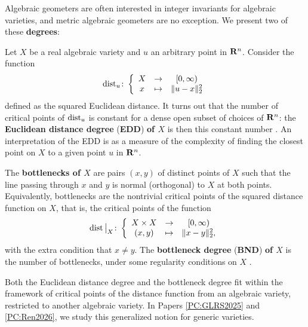 Algebraic geometers are often interested in integer invariants for algebraic varieties, and metric algebraic geometers are no exception. We present two of these \textbf{degrees}:

\begin{definition}
  Let $X$ be a real algebraic variety and $u$ an arbitrary point in $\mathbf{R}^n$. Consider the function
  \[
    \operatorname{dist}_u \colon \left\{ \begin{array}{ccc}
      X & \to & [0, \infty) \\
      x & \mapsto & \| u - x \|_2^2
    \end{array} \right.
  \]
  defined as the squared Euclidean distance. It turns out that the number of critical points of $\operatorname{dist}_u$ is constant for a dense open subset of choices of $\mathbf{R}^n$: the \textbf{Euclidean distance degree} (\textbf{EDD}) \textbf{of $X$} is then this constant number \cite{DHOST2016}. An interpretation of the EDD is as a measure of the complexity of finding the closest point on $X$ to a given point $u$ in $\mathbf{R}^n$.
  
  The \textbf{bottlenecks of $X$} are pairs $(x, y)$ of distinct points of $X$ such that the line passing through $x$ and $y$ is normal (orthogonal) to $X$ at both points. Equivalently, bottlenecks are the nontrivial critical points of the squared distance function on $X$, that is, the critical points of the function
  \[
    \operatorname{dist}\big|_X \colon \left\{ \begin{array}{ccc}
      X \times X & \to & [0, \infty) \\
      (x, y) & \mapsto & \| x - y \|_2^2,
    \end{array} \right.
  \]
  with the extra condition that $x \neq y$. The \textbf{bottleneck degree} (\textbf{BND}) \textbf{of $X$} is the number of bottlenecks, under some regularity conditions on $X$ \cite{DREW2020}.
\end{definition}

Both the Euclidean distance degree and the bottleneck degree fit within the framework of critical points of the distance function from an algebraic variety, restricted to another algebraic variety. In Papers \ref{PC:GLRS2025} and \ref{PC:Ren2026}, we study this generalized notion for generic varieties.